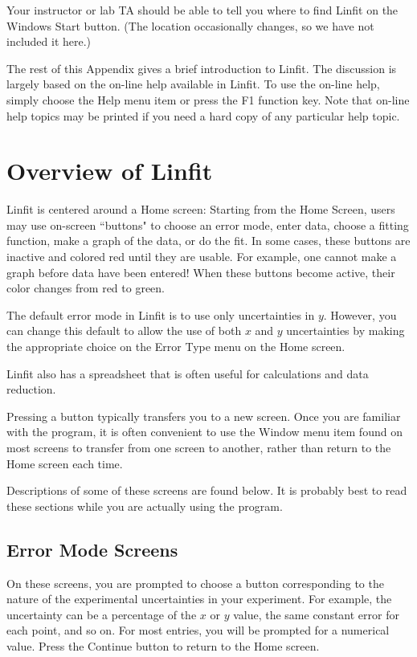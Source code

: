 Your instructor or lab TA should be able to tell you where to find
Linfit on the Windows Start button.  (The location occasionally
changes, so we have not included it here.)

The rest of this Appendix gives a brief introduction to Linfit.  The
discussion is largely based
on the on-line help available in Linfit.  To use the
on-line help, simply choose the Help menu item or press the F1
function key.  Note that on-line help topics may be printed if you
need a hard copy of any particular help topic.

\section*{Overview of Linfit}

Linfit is centered around a Home screen: Starting from
the Home Screen, users may use on-screen ``buttons" to choose an error
mode, enter data, choose a fitting function, make a graph of the data,
or do the fit.  In some cases, these buttons are inactive and colored
red until they are usable.  For example, one cannot make a graph
before data have been entered!  When these buttons become active,
their color changes from red to green.

The default error mode in Linfit is to use only uncertainties in $y$.
However, you can change this default to allow the use of both $x$ and
$y$ uncertainties by making the appropriate choice on the Error Type
menu on the Home screen.

Linfit also has a spreadsheet that is often useful for calculations
and data reduction.

Pressing a button typically transfers you to a new screen.  Once you
are familiar with the program, it is often convenient to use the Window menu
item found on most screens to transfer from one screen to another,
rather than return to the Home screen each time.

Descriptions of some of these screens are found below.  It is probably
best to read these sections while you are actually using the program.

\subsection*{Error Mode Screens}

On these screens, you are prompted to choose a button corresponding to
the nature of the experimental uncertainties in your experiment.  For
example, the uncertainty can be a percentage of the $x$ or $y$ value,
the same constant error for each point, and so on.  For most entries,
you will be prompted for a numerical value.  Press the Continue button
to return to the Home screen.

